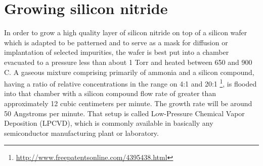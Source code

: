 \section{Growing silicon nitride}\label{chemistry_growing_nitride}
In order to grow a high quality layer of silicon nitride on top of a silicon wafer which is adapted to be patterned and to serve as a mask for diffusion or implantation of selected impurities, the wafer is best put into a chamber evacuated to a pressure less than about 1 Torr and heated between 650 and 900 \degree C.
A gaseous mixture comprising primarily of ammonia and a silicon compound, having a ratio of relative concentrations in the range on 4:1 and 20:1 \footnote{\url{http://www.freepatentsonline.com/4395438.html}}, is flooded into that chamber with a silicon compound flow rate of greater than approximately 12 cubic centimeters per minute.
The growth rate will be around 50 Angstroms per minute.
That setup is called Low-Pressure Chemical Vapor Deposition (LPCVD), which is commonly available in basically any semiconductor manufacturing plant or laboratory.
